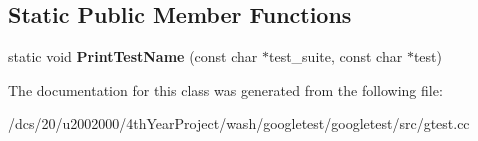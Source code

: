\subsection*{Static Public Member Functions}
\begin{DoxyCompactItemize}
\item 
\mbox{\label{classtesting_1_1internal_1_1PrettyUnitTestResultPrinter_aba6463878ddb96303f620c62353bbdb5}} 
static void {\bfseries Print\+Test\+Name} (const char $\ast$test\+\_\+suite, const char $\ast$test)
\end{DoxyCompactItemize}


The documentation for this class was generated from the following file\+:\begin{DoxyCompactItemize}
\item 
/dcs/20/u2002000/4th\+Year\+Project/wash/googletest/googletest/src/gtest.\+cc\end{DoxyCompactItemize}
